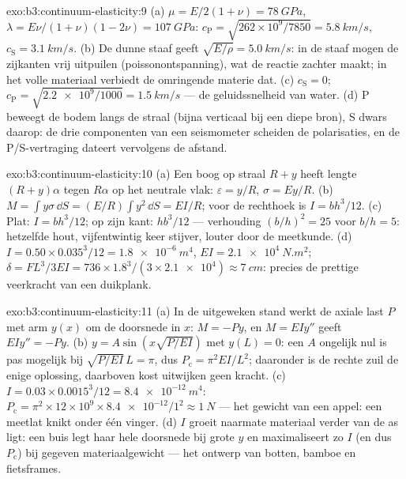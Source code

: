 \begin{solution}{exo:b3:continuum-elasticity:9}
(a) $\mu = E/2(1+\nu) = \qty{78}{GPa}$, $\lambda = E\nu/(1+\nu)(1-2\nu)
= \qty{107}{GPa}$: $c_{\text{P}} = \sqrt{262\times10^9/7850} =
\qty{5.8}{km/s}$, $c_{\text{S}} = \qty{3.1}{km/s}$. (b) De dunne staaf
geeft $\sqrt{E/\rho} = \qty{5.0}{km/s}$: in de staaf mogen de zijkanten
vrij uitpuilen (poissonontspanning), wat de reactie zachter maakt; in het
volle materiaal verbiedt de omringende materie dat. (c) $c_{\text{S}} = 0$; $c_{\text{P}} = \sqrt{\num{2.2e9}/1000} = \qty{1.5}{km/s}$ --- de
geluidssnelheid van water. (d) P beweegt de bodem langs de straal (bijna
verticaal bij een diepe bron), S dwars daarop: de drie componenten van
een seismometer scheiden de polarisaties, en de P/S-vertraging dateert
vervolgens de afstand.
\end{solution}

\begin{solution}{exo:b3:continuum-elasticity:10}
(a) Een boog op straal $R + y$ heeft lengte $(R + y)\alpha$ tegen
$R\alpha$ op het neutrale vlak: $\varepsilon = y/R$, $\sigma =
Ey/R$. (b) $M = \int y\sigma\,\dd S = (E/R)\int y^2\,\dd S = EI/R$;
voor de rechthoek is $I = bh^3/12$. (c) Plat: $I = bh^3/12$; op zijn
kant: $hb^3/12$ --- verhouding $(b/h)^2 = 25$ voor $b/h = 5$: hetzelfde
hout, vijfentwintig keer stijver, louter door de meetkunde. (d) $I = 0.50 \times
0.035^3/12 = \qty{1.8e-6}{m^4}$, $EI = \qty{2.1e4}{N.m^2}$;
$\delta =
FL^3/3EI = 736 \times 1.8^3/(3 \times \num{2.1e4}) \approx
\qty{7}{cm}$: precies de prettige veerkracht van een duikplank.
\end{solution}

\begin{solution}{exo:b3:continuum-elasticity:11}
(a) In de uitgeweken stand werkt de axiale last $P$ met arm $y(x)$ om de
doorsnede in $x$: $M = -Py$, en $M = EIy''$ geeft $EIy'' = -Py$. (b) $y = A\sin(x\sqrt{P/EI})$ met $y(L) = 0$: een $A$ ongelijk nul is pas mogelijk
bij $\sqrt{P/EI}\,L = \pi$, dus $P_{\text{c}} =
\pi^2EI/L^2$; daaronder
is de rechte zuil de enige oplossing, daarboven kost uitwijken geen
kracht. (c) $I = 0.03 \times 0.0015^3/12 =
\qty{8.4e-12}{m^4}$:
$P_{\text{c}} = \pi^2 \times 12\times10^9 \times
\num{8.4e-12}/1^2 \approx \qty{1}{N}$ --- het gewicht van een appel: een meetlat knikt
onder één vinger. (d) $I$ groeit naarmate materiaal verder van de as
ligt: een buis legt haar hele doorsnede bij grote $y$ en maximaliseert
zo $I$ (en dus $P_{\text{c}}$) bij gegeven materiaalgewicht --- het
ontwerp van botten, bamboe en fietsframes.
\end{solution}

